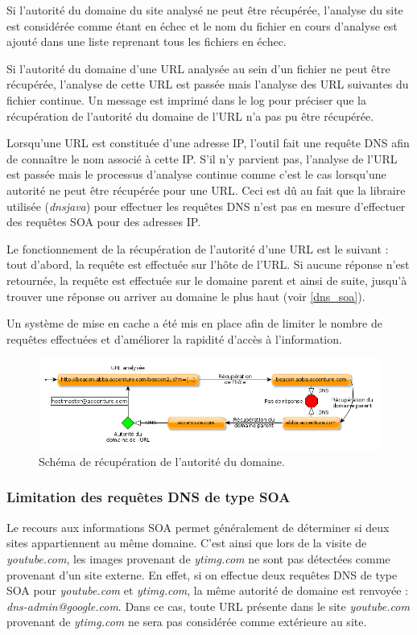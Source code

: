 Si l'autorité du domaine du site analysé ne peut être récupérée, l'analyse du site est considérée comme étant en échec et le nom du fichier en cours d'analyse est ajouté dans une liste reprenant tous les fichiers en échec.

Si l'autorité du domaine d'une URL analysée au sein d'un fichier ne peut être récupérée, l'analyse de cette URL est passée mais l'analyse des URL suivantes du fichier continue. Un message est imprimé dans le log pour préciser que la récupération de l'autorité du domaine de l'URL n'a pas pu être récupérée.

Lorsqu'une URL est constituée d'une adresse IP, l'outil fait une requête DNS afin de connaître le nom associé à cette IP. S'il n'y parvient pas, l'analyse de l'URL est passée mais le processus d'analyse continue comme c'est le cas lorsqu'une autorité ne peut être récupérée pour une URL. Ceci est dû au fait que la libraire utilisée (\textit{dnsjava}) pour effectuer les requêtes DNS n'est pas en mesure d'effectuer des requêtes SOA pour des adresses IP.
\newline

Le fonctionnement de la récupération de l'autorité d'une URL est le suivant : tout d'abord, la requête est effectuée sur l'hôte de l'URL. Si aucune réponse n'est retournée, la requête est effectuée sur le domaine parent et ainsi de suite, jusqu'à trouver une réponse ou arriver au domaine le plus haut (voir \autoref{dns_soa}).

Un système de mise en cache a été mis en place afin de limiter le nombre de requêtes effectuées et d'améliorer la rapidité d'accès à l'information.

\begin{figure}[h]
	\centering
	\includegraphics[scale=0.55]{figures/DNS_SOA.png}
	\caption{\label{dns_soa}Schéma de récupération de l'autorité du domaine.}
\end{figure}

\subsubsection{Limitation des requêtes DNS de type SOA}
Le recours aux informations SOA permet généralement de déterminer si deux sites appartiennent au même domaine. C'est ainsi que lors de la visite de \textit{youtube.com}, les images provenant de \textit{ytimg.com} ne sont pas détectées comme provenant d'un site externe. %
En effet, si on effectue deux requêtes DNS de type SOA pour \textit{youtube.com} et \textit{ytimg.com}, la même autorité de domaine est renvoyée : \textit{dns-admin@google.com}.
Dans ce cas, toute URL présente dans le site \textit{youtube.com} provenant de \textit{ytimg.com} ne sera pas considérée comme extérieure au site.
\newline

